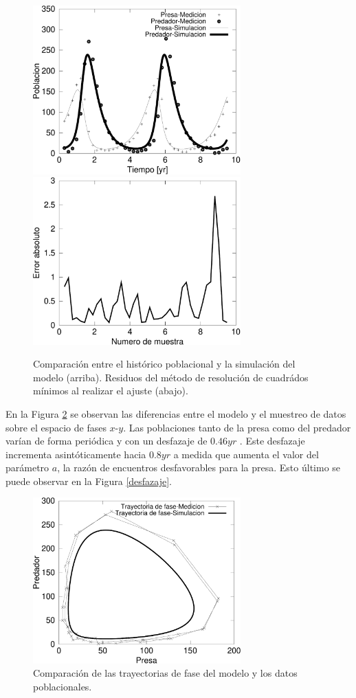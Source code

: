 \documentclass{article}
\numberwithin{equation}{section}
\begin{document}
\begin{multicols}{2}
\begin{figure}[H]
\centering
\includegraphics[width=8cm]{images/a1} \
\includegraphics[width=8cm]{images/a3-bis} \
\caption{Comparación entre el histórico poblacional y la simulación del modelo (arriba). Residuos del método de resolución de cuadrádos mínimos al realizar el ajuste (abajo).}
\label{comp_x_y}
\end{figure}

En la Figura \ref{trayectoria_fase} se observan las diferencias entre el modelo y el muestreo de datos sobre el espacio de fases $x$-$y$. Las poblaciones tanto de la presa como del predador varían de forma periódica y con un desfazaje de $0.46yr$ . Este desfazaje incrementa asintóticamente hacia $0.8yr$ a medida que aumenta el valor del parámetro $a$, la razón de encuentros desfavorables para la presa. Esto último se puede observar en la Figura \ref{desfazaje}.

\begin{figure}[H]
\centering
\includegraphics[width=8cm]{images/a2}
\caption{Comparación de las trayectorias de fase del modelo y los datos poblacionales.}
\label{trayectoria_fase}
\end{figure}



\end{multicols}
\end{document}

